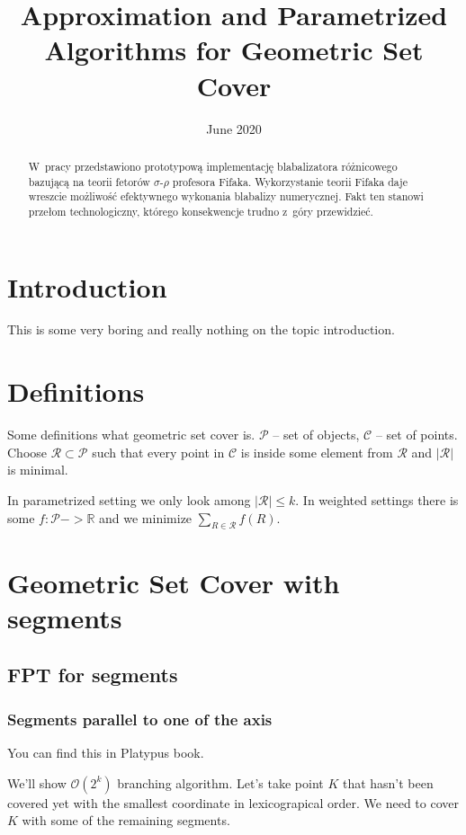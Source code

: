 \documentclass[en]{pracamgr}
\title{Approximation and Parametrized Algorithms for Geometric Set Cover}
\date{June 2020}
\newcommand{\points}{\mathcal{C}}
\newcommand{\sets}{\mathcal{P}}
\newcommand{\sol}{\mathcal{R}}
\begin{document}
\maketitle

\begin{abstract}
  W~pracy przedstawiono prototypową implementację blabalizatora
  różnicowego bazującą na teorii fetorów $\sigma$-$\rho$ profesora
  Fifaka.  Wykorzystanie teorii Fifaka daje wreszcie możliwość
  efektywnego wykonania blabalizy numerycznej.  Fakt ten stanowi
  przełom technologiczny, którego konsekwencje trudno z~góry
  przewidzieć.
\end{abstract}

\tableofcontents

\chapter{Introduction}
This is some very boring and really nothing on the topic introduction.
\chapter{Definitions}
Some definitions what geometric set cover is.
$\sets$ -- set of objects, $\points$ -- set of points.
Choose $\sol \subset \sets$ such that
every point in $\points$ is inside some element from $\sol$
and $|\sol|$ is minimal.

In parametrized setting we only look among $|\sol| \le k$.
In weighted settings there is some $f : \sets -> \mathbb{R}$
and we minimize $\sum_{R \in \sol} f(R)$.
 
\chapter{Geometric Set Cover with segments}

\section{FPT for segments}
\subsection{Segments parallel to one of the axis}
You can find this in Platypus book.

We'll show $\mathcal{O}(2^k)$ branching algorithm.
Let's take point $K$ that hasn't been covered yet with
the smallest coordinate in lexicograpical order.
We need to cover $K$ with some of the remaining segments.
\end{document}
